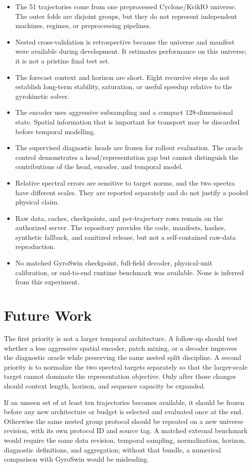 \begin{itemize}
  \item The 51 trajectories come from one preprocessed Cyclone/KvikIO universe. The outer folds
        are disjoint groups, but they do not represent independent machines, regimes, or
        preprocessing pipelines.
  \item Nested cross-validation is retrospective because the universe and manifest were available
        during development. It estimates performance on this universe; it is not a pristine final
        test set.
  \item The forecast context and horizon are short. Eight recursive steps do not establish
        long-term stability, saturation, or useful speedup relative to the gyrokinetic solver.
  \item The encoder uses aggressive subsampling and a compact 128-dimensional state. Spatial
        information that is important for transport may be discarded before temporal modelling.
  \item The supervised diagnostic heads are frozen for rollout evaluation. The oracle control
        demonstrates a head/representation gap but cannot distinguish the contributions of the
        head, encoder, and temporal model.
  \item Relative spectral errors are sensitive to target norms, and the two spectra have different
        scales. They are reported separately and do not justify a pooled physical claim.
  \item Raw data, caches, checkpoints, and per-trajectory rows remain on the authorized server.
        The repository provides the code, manifests, hashes, synthetic fallback, and sanitized
        release, but not a self-contained raw-data reproduction.
  \item No matched GyroSwin checkpoint, full-field decoder, physical-unit calibration, or end-to-end
        runtime benchmark was available. None is inferred from this experiment.
\end{itemize}

\section{Future Work}

The first priority is not a larger temporal architecture. A follow-up should test whether a less
aggressive spatial encoder, patch mixing, or a decoder improves the diagnostic oracle while
preserving the same nested split discipline. A second priority is to normalize the two spectral
targets separately so that the larger-scale target cannot dominate the representation objective.
Only after those changes should context length, horizon, and sequence capacity be expanded.

If an unseen set of at least ten trajectories becomes available, it should be frozen before any
new architecture or budget is selected and evaluated once at the end. Otherwise the same nested
group protocol should be repeated on a new universe revision, with its own protocol ID and source
tag. A matched external benchmark would require the same data revision, temporal sampling,
normalization, horizon, diagnostic definitions, and aggregation; without that bundle, a numerical
comparison with GyroSwin would be misleading.
